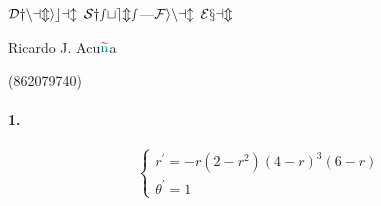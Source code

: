 \documentclass{article}
\begin{document}
\begin{center}
  $\mathcal{Dynamical\enskip Systems}$---$\mathcal{Final\enskip Exam}$

  \color{red}R\color{teal}icardo
  \color{red}J\color{cyan}.
  \color{red}A\color{teal}cu$\color{red}{\widetilde{\color{teal}\text{n}}}$\color{teal}a\color{black}

  \color{teal}(\color{red}862079740\color{teal})\color{black}
\end{center}
\vspace{1.618em}

\paragraph{1.}

\[\begin{cases}r^\prime = -r(2-r^2)(4-r)^3(6-r)\\
      \theta^\prime = 1\end{cases}\]
\end{document}
